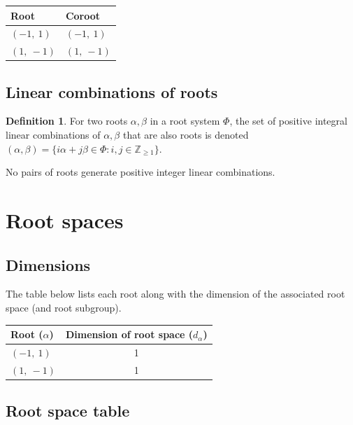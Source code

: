 \documentclass[11pt]{article}
\theoremstyle{definition}
\newtheorem{definition}{Definition}[section]
\begin{document}
\begin{tabular}{|l|l|}
    \hline
    \textbf{Root} & \textbf{Coroot} \\
    \hline
    $\left( -1, \  1\right)$ & $\left( -1, \  1\right)$ \\
    \hline
    $\left( 1, \  -1\right)$ & $\left( 1, \  -1\right)$ \\
    \hline
\end{tabular}


\subsection{Linear combinations of roots}

\begin{definition}
For two roots $\alpha, \beta$ in a root system $\Phi$, the set of positive integral linear combinations of $\alpha, \beta$ that are also roots is denoted
\(
	(\alpha, \beta) = \{ i \alpha + j \beta \in \Phi : i, j \in \mathbb{Z}_{\ge 1} \}
\).
\end{definition}

\noindent No pairs of roots generate positive integer linear combinations.


\newpage
\section{Root spaces}

\subsection{Dimensions}

The table below lists each root along with the dimension of the associated root space (and root subgroup).

\bigskip

\noindent \begin{tabular}{|l|c|}
    \hline
    \textbf{Root ($\alpha$)} & \textbf{Dimension of root space ($d_{\alpha}$)} \\
    \hline
    $\left( -1, \  1\right)$ & 1 \\
    \hline
    $\left( 1, \  -1\right)$ & 1 \\
    \hline
\end{tabular}


\subsection{Root space table}
\end{document}
